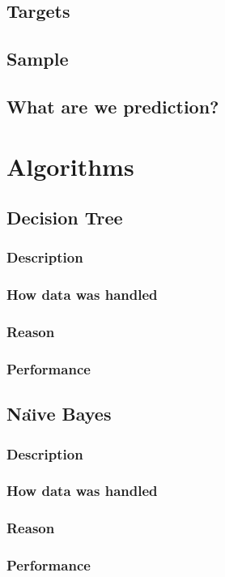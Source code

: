 \documentclass[12pt]{article}
\begin{document}
	\subsection{Targets}
	\subsection{Sample}
	\subsection{What are we prediction?}
	\newpage
	
	\section{Algorithms}
	\subsection{Decision Tree}
	\subsubsection{Description}
	\subsubsection{How data was handled}
	\subsubsection{Reason}
	\subsubsection{Performance}
	\newpage
	\subsection{Na\"{\i}ve Bayes}
	\subsubsection{Description}
	\subsubsection{How data was handled}
	\subsubsection{Reason}
	\subsubsection{Performance}
	\newpage
\end{document}
